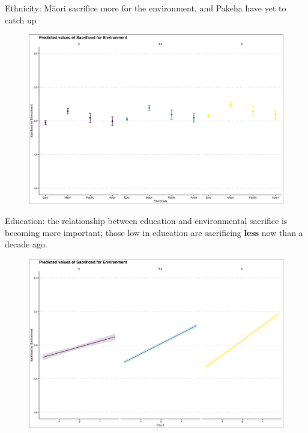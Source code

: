 \documentclass{beamer}
\begin{document}
\begin{frame}{Ethnicity: Māori sacrifice more for the environment, and Pakeha have yet to catch up}
\begin{figure}
\includegraphics[width=.8\textwidth,height=\textheight,keepaspectratio]{Figures/SACRIFICEMADE_EthnicCats_T.png}
\end{figure}
\end{frame}

\begin{frame}{Education: the relationship between education and environmental sacrifice is becoming more important; those low in education are sacrificing {\bf less} now than a decade ago.}
\begin{figure}
\includegraphics[width=.8\textwidth,height=\textheight,keepaspectratio]{Figures/SACRIFICEMADE_Edu.S.png}
\end{figure}
\end{frame}
\end{document}

